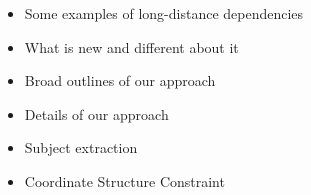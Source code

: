 \documentclass[a4paper,landscape,headrule,footrule]{foils}
\begin{document}
\maketitle


\begin{itemize}
\item Some examples of long-distance dependencies
\item What is new and different about it
\item Broad outlines of our approach
\item Details of our approach
\item Subject extraction
\item Coordinate Structure Constraint
\end{itemize}




\end{document}

